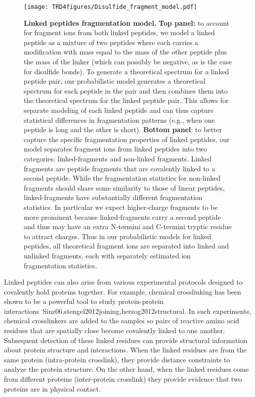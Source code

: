 \begin{figure}[h!]
	\centering
		\texttt{[image: TRD4figures/Disulfide\_fragment\_model.pdf]}
		\caption{\footnotesize{\bf Linked peptides fragmentation model.} { {\bf Top panel:} to account for fragment ions from both linked peptides, we model a linked peptide as a mixture of two peptides where each carries a modification with mass equal to the mass of the other peptide plus the mass of the linker (which can possibly be negative, as is the case for disulfide bonds). To generate a theoretical spectrum for a linked peptide pair, our probabilistic model generates a theoretical spectrum for each peptide in the pair and then combines them into the theoretical spectrum for the linked peptide pair. This allows for separate modeling of each linked peptide and can thus capture statistical differences in fragmentation patterns (e.g., when one peptide is long and the other is short). {\bf Bottom panel}: to better capture the specific fragmentation properties of linked peptides, our model separates fragment ions from linked peptides into two categories: linked-fragments and non-linked fragments. Linked fragments are peptide fragments that are covalently linked to a second peptide.  While the fragmentation statistics for non-linked fragments should share some similarity to those of linear peptides, linked-fragments have substantially different fragmentation statistics. In particular we expect higher-charge fragments to be more prominent because linked-fragments carry a second peptide and thus may have an extra N-termini and C-termini tryptic residue to attract charges. Thus in our probabilistic models for linked peptides, all theoretical fragment ions are separated into linked and unlinked fragments, each with separately estimated ion fragmentation statistics.}}
\label{linkedmodel}
\end{figure}

Linked peptides can also arise from various experimental protocols designed to covalently hold proteins together. For example, chemical crosslinking has been shown to be a powerful tool to study protein-protein interactions~\cite{unv}{Sinz06,stengel2012joining,herzog2012structural}.  
 In such experiments, chemical crosslinkers are added to the samples so pairs of reactive amino acid residues that are spatially close become covalently linked to one another.  Subsequent detection of these linked residues can provide structural information about protein structure and interactions. When the linked residues are from the same protein (intra-protein crosslink), they provide distance constraints to analyze the protein structure. On the other hand, when the linked residues come from different proteins (inter-protein crosslink) they provide evidence that two proteins are in physical contact.

